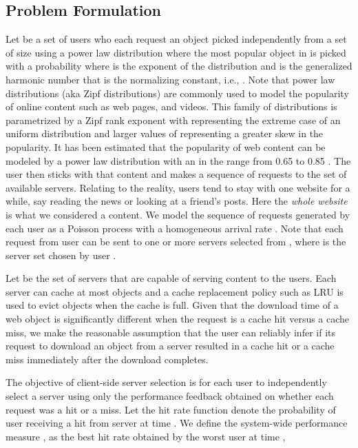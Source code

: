 \documentclass[conference]{IEEEtran}
\begin{document}
\subsection{Problem Formulation}
Let   be a set of  users who each request an object picked independently from a set  of size  using a power law distribution where the  most popular object in  is picked with a probability  where  is the exponent of the distribution and  is the generalized harmonic number that is the normalizing constant, i.e.,  . Note that power law distributions (aka Zipf distributions) are commonly used to model the popularity of  online content such as web pages, and videos. This family of distributions is parametrized by a Zipf rank exponent   with  representing the extreme case of an uniform distribution and larger values of  representing a greater skew in the popularity. It has been estimated that the popularity of web content can be modeled by a power law distribution with an   in the range from 0.65 to 0.85 \cite{Breslau:1999,Gill:2007,Fricker:2012}.
The user then sticks with that content and makes a sequence of requests to the set of available servers. Relating to the reality, users tend to stay with one website for a while, say reading the news or looking at a friend's posts. Here the \textsl{whole website} is what we considered a content. We model  the sequence of requests generated by each user as a Poisson process with a homogeneous arrival rate .  Note that each request from user  can be sent to one or more servers selected from , where  is the server set chosen by user .

Let   be the set of  servers that are capable of serving content to the users. Each server can cache at most  objects and a cache replacement policy such as LRU is used to evict objects when the cache is full. Given that the download time of a web object is significantly different when the request is a cache hit versus a cache miss, we make the reasonable assumption that the user can reliably infer if its request to download an object from a server resulted in a  cache hit or a cache miss immediately after the download completes.

The objective of client-side server selection is for each user  to independently  select a server  using only the performance feedback obtained on whether each request was a hit or a miss. Let  the hit rate function  denote the probability of user  receiving a hit from server  at time . We define the system-wide performance measure , as the best hit rate obtained by the worst user at time ,
 
\end{document}

